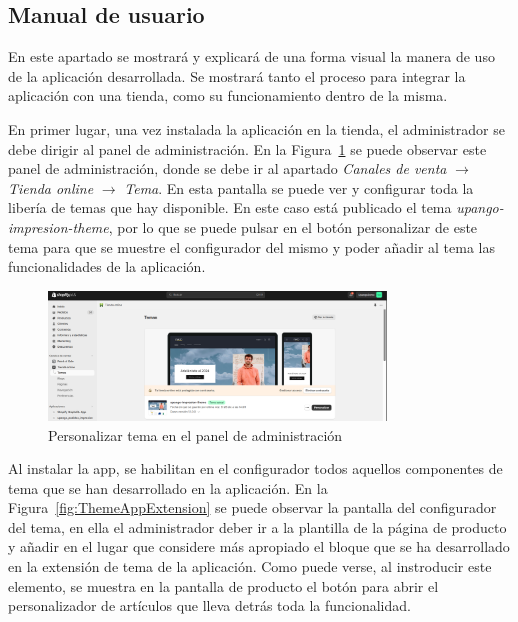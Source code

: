 \documentclass[12pt]{article}
\begin{document}
\subsection{Manual de usuario}
En este apartado se mostrará y explicará de una forma visual la manera de uso de la aplicación desarrollada. Se mostrará tanto el proceso para integrar la aplicación con una tienda, como
su funcionamiento dentro de la misma.

En primer lugar, una vez instalada la aplicación en la tienda, el administrador se debe dirigir al panel de administración. En la Figura~\ref{fig:PersonalizarTema} se puede observar este panel de administración, donde
se debe ir al apartado \textit{Canales de venta} $\rightarrow$  \textit{Tienda online} $\rightarrow$  \textit{Tema}. En esta pantalla se puede ver y configurar toda la libería de temas que hay disponible.
En este caso está publicado el tema \textit{upango-impresion-theme}, por lo que se puede pulsar en el botón personalizar de este tema para que se muestre el configurador del mismo y poder
añadir al tema las funcionalidades de la aplicación.

\begin{figure}[ht]
    \centering
    \includegraphics[width=0.8\textwidth]{imagenes/ManualUsuario/PantallaDePersonalizarTema.png}
    \caption{\label{fig:PersonalizarTema}Personalizar tema en el panel de administración}
    \vspace{\fill}
\end{figure}

Al instalar la app, se habilitan en el configurador todos aquellos componentes de tema que se han desarrollado en la aplicación.
En la Figura~\ref{fig:ThemeAppExtension} se puede observar la pantalla del configurador del tema, en ella el administrador deber ir a la plantilla de la página de producto y añadir
en el lugar que considere más apropiado el bloque que se ha desarrollado en la extensión de tema de la aplicación. Como puede verse, al instroducir este elemento, se muestra en la pantalla de producto
el botón para abrir el personalizador de artículos que lleva detrás toda la funcionalidad.
\end{document}
